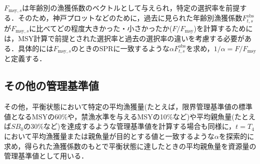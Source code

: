 \documentclass[11pt]{jsarticle}
\begin{document}
$F_{\mathrm{msy},s}$は年齢別の漁獲係数のベクトルとして与えられ，特定の選択率を前提する．そのため，神戸プロットなどのために，過去に見られた年齢別漁獲係数$F_{t,s}^{\mathrm{obs}}$が$F_{\mathrm{msy},s}$に比べてどの程度大きかった・小さかったか($F/F_{\mathrm{msy}}$)を計算するためには，MSY計算で前提とされた選択率と過去の選択率の違いを考慮する必要がある．具体的には$F_{\mathrm{msy},s}$のときのSPRに一致するような$\alpha F_{t,s}^{\mathrm{obs}}$を求め，$1/\alpha=F/F_{\mathrm{msy}}$と定義する．

\subsection{その他の管理基準値}
その他，平衡状態において特定の平均漁獲量(たとえば，限界管理基準値の標準値となるMSYの60\%や，禁漁水準を与えるMSYの10\%など)や平均親魚量(たとえば$S\!B_0$の30\%など)を達成するような管理基準値を計算する場合も同様に，$t=T_4$において平均漁獲量または親魚量が目的とする値と一致するような$\alpha$を探索的に求め，得られた漁獲係数のもとで平衡状態に達したときの平均親魚量を資源量の管理基準値として用いる．
\end{document}

